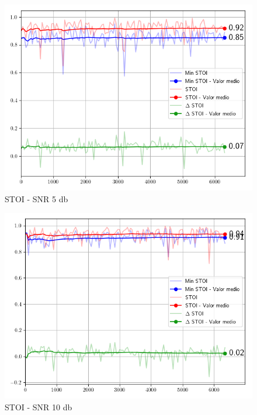 \begin{figure}
	\centering
	\centerline{\includegraphics[scale=0.75]{images/ch6/af/objective_metrics/metric_STOI_5db.png}}
	\caption{STOI - SNR 5 db}
	\label{fig:ch6_stoi_five_db}
\end{figure}

\begin{figure}
	\centering
	\centerline{\includegraphics[scale=0.75]{images/ch6/af/objective_metrics/metric_STOI_10db.png}}
	\caption{STOI - SNR 10 db}
	\label{fig:ch6_stoi_ten_db}
\end{figure}

